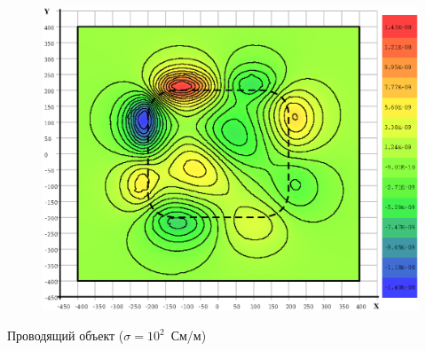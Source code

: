 \documentclass[aspectratio=43,usepdftitle=false]{beamer}
\begin{document}
\begin{frame}
\begin{columns}[t,totalwidth=\linewidth]
\begin{column}{.5\linewidth}
\begin{figure}[H]
				\includegraphics[width=1.1\textwidth,height=1.1\textheight,keepaspectratio]{0_yes_z=-601_EzR.eps}
			\end{figure}
			\begin{center}
				\vspace{-1em}
				\tiny{Проводящий объект ($\sigma = 10^{2}$~См/м)}
			\end{center}
		\end{column}
	\end{columns}
\end{frame}

\end{document}
